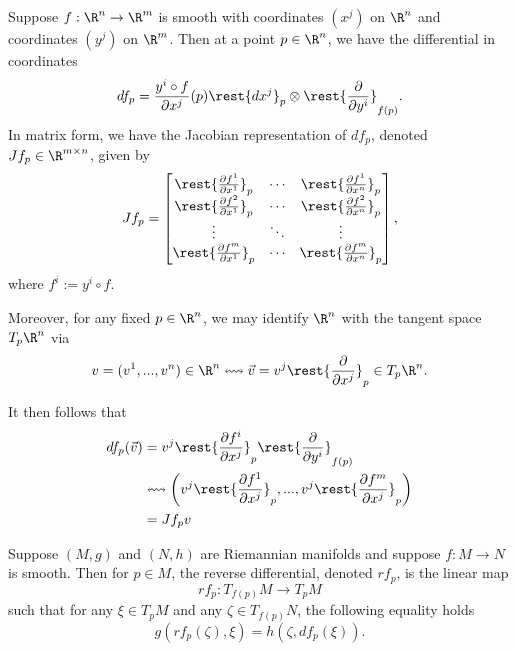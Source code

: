 \begin{ex}
	Suppose $f:\R^n\to\R^m$ is smooth with coordinates $(x^j)$ on $\R^n$ and coordinates $(y^j)$ on $\R^m$.  Then at a point $p\in\R^n$, we have the differential in coordinates
	$$df_p=\frac{y^i\circ f}{\partial x^j}(p)\rest{dx^j}_p\otimes\rest{\frac{\partial}{\partial y^i}}_{f(p)}.$$
	In matrix form, we have the Jacobian representation of $df_p$, denoted $Jf_p\in\R^{m\times n}$, given by
	$$Jf_p=\begin{bmatrix}
		\rest{\frac{\partial f^1}{\partial x^1}}_p&\cdots&\rest{\frac{\partial f^1}{\partial x^n}}_p\\
		\rest{\frac{\partial f^2}{\partial x^1}}_p&\cdots&\rest{\frac{\partial f^2}{\partial x^n}}_p\\
		\vdots&\ddots&\vdots\\
		\rest{\frac{\partial f^m}{\partial x^1}}_p&\cdots&\rest{\frac{\partial f^m}{\partial x^n}}_p
	\end{bmatrix},$$
	where $f^i:=y^i\circ f.$
	
	Moreover, for any fixed $p\in\R^n$, we may identify $\R^n$ with the tangent space $T_p\R^n$ via
	$$v=(v^1,...,v^n)\in\R^n\leftrightsquigarrow \vec{v}=v^j\rest{\frac{\partial}{\partial x^j}}_p\in T_p\R^n.$$
	
	It then follows that
	\begin{align*}
		df_p(\vec{v})&=v^j\rest{\frac{\partial f^i}{\partial x^j}}_p\rest{\frac{\partial}{\partial y^i}}_{f(p)}\\
		&\leftrightsquigarrow\left(v^j\rest{\frac{\partial f^1}{\partial x^j}}_p,...,v^j\rest{\frac{\partial f^m}{\partial x^j}}_p\right)\\
		&=Jf_pv
	\end{align*}
\end{ex}

\begin{defn}\label{def:reverseDifferential}
	Suppose $(M,g)$ and $(N,h)$ are Riemannian manifolds and suppose $f:M\to N$ is smooth.  Then for $p\in M$, the reverse differential, denoted $rf_p$, is the linear map
	$$rf_p:T_{f(p)}M\to T_pM$$
	such that for any $\xi\in T_pM$ and any $\zeta\in T_{f(p)} N$, the following equality holds
	$$g(rf_p(\zeta),\xi)=h(\zeta, df_p(\xi)).$$
\end{defn}

